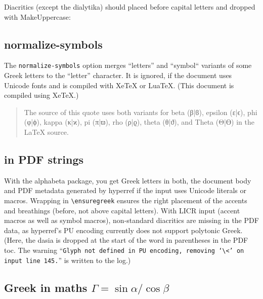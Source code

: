 \documentclass{article}
\newcommand{\engine}{XeTeX}
\newcommand{\engine}{LuaTeX}
\newcommand{\engine}{8-bit TeX}
\begin{document}
Diacritics (except the dialytika) should placed
before capital letters and dropped with MakeUppercase:

\begin{quote}
\end{quote}


\subsection{normalize-symbols}

The \texttt{normalize-symbols} option merges ``letters'' and ``symbol``
variants of some Greek letters to the ``letter'' character. It is ignored,
if the document uses Unicode fonts and is compiled with XeTeX or LuaTeX.
(This document is compiled using \engine.)
\begin{quote}
  The source of this quote uses both variants for beta (β|ϐ),
  epsilon (ε|ϵ), phi (φ|ϕ), kappa (κ|ϰ), pi (π|ϖ), rho (ρ|ϱ), theta (θ|ϑ),
  and Theta (Θ|ϴ) in the LaTeX source.%
\end{quote}


\subsection{
  in PDF strings}

With the alphabeta package, you get Greek letters in both, the document body
and PDF metadata generated by hyperref if the input uses Unicode literals or
macros. Wrapping in \verb+\ensuregreek+ ensures the right placement of the
accents and breathings (before, not above capital letters). With LICR input
(accent macros as well as symbol macros), non-standard diacritics are
missing in the PDF data, as hyperref's PU encoding currently does not
support polytonic Greek. (Here, the dasia is dropped at the start of the
word in parentheses in the PDF toc. The warning ``\texttt{Glyph not defined
in PU encoding, removing `\textbackslash<' on input line 145.}'' is written
to the log.)


\subsection{Greek in maths $\Gamma = \sin\alpha / \cos{\beta}$}
\end{document}

